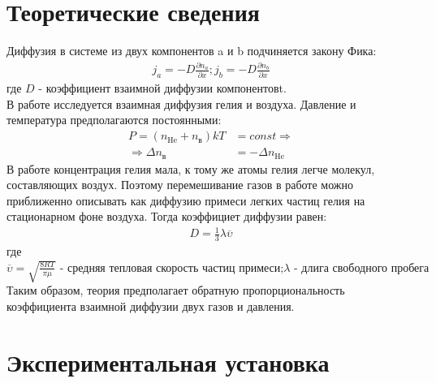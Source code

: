 \section*{Теоретические сведения}

Диффузия в системе из двух компонентов a и b подчиняется
закону Фика:
\begin{align}
    j_a = -D \frac{\partial n_a}{\partial x}; j_b = -D\frac{\partial n_b}{\partial x}
\end{align}
где $D$ - коэффициент взаимной диффузии компонентовt.\\\indent
В работе исследуется взаимная диффузия гелия и воздуха. 
Давление и температура предполагаются постоянными:
\begin{align}
    P = (n_{\text{He}} + n_{\text{в}})kT &= const \Rightarrow \\ 
    \Rightarrow \Delta n_{\text{в}} &= -\Delta n_{\text{He}}
\end{align}
\indent В работе концентрация гелия мала, к тому же атомы гелия легче молекул,
составляющих воздух. Поэтому перемешивание газов в работе можно приближенно
описывать как диффузию примеси легких частиц гелия на стационарном фоне воздуха. 
Тогда коэффициет диффузии равен:
\begin{align}
    D = \frac{1}{3}\lambda\overline{\upsilon}
\end{align}
где $\overline{\upsilon} = \sqrt{\frac{8 R T}{\pi\mu}}\text{ - средняя тепловая скорость частиц примеси;$\lambda$ - длига свободного пробега}$\\ 
\indent
Таким образом, теория предполагает обратную пропорциональность 
коэффициента взаимной диффузии двух газов и давления.\\

\section*{Экспериментальная установка}
\indent
